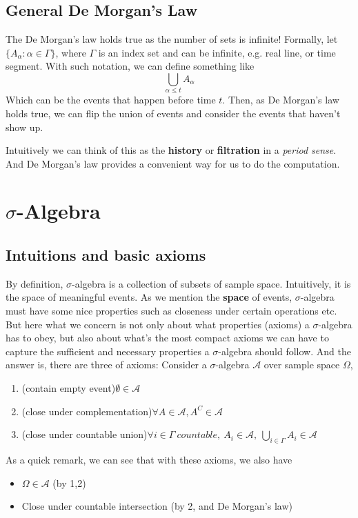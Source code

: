 \documentclass[11pt]{report}
\begin{document}
\subsection{General De Morgan's Law}
The De Morgan's law holds true as the number of sets is infinite! Formally, let $\{A_{\alpha}:\alpha\in\Gamma \}$, where $\Gamma$ is an index set and can be infinite, e.g. real line, or time segment. With such notation, we can define something like
$$\bigcup_{\alpha\leq t} A_{\alpha}$$
Which can be the events that happen before time $t$. Then, as De Morgan's law holds true, we can flip the union of events and consider the events that haven't show up. 

Intuitively we can think of this as the {\bf history} or {\bf filtration} in a {\it period sense}. And De Morgan's law provides a convenient way for us to do the computation.

\section{$\sigma$-Algebra}
\subsection{Intuitions and basic axioms}
By definition, $\sigma$-algebra is a collection of subsets of sample space. Intuitively, it is the space of meaningful events. As we mention the {\bf space} of events, $\sigma$-algebra must have some nice properties such as closeness under certain operations etc. But here what we concern is not only about what properties (axioms) a $\sigma$-algebra has to obey, but also about what's the most compact axioms we can have to capture the sufficient and necessary properties a $\sigma$-algebra should follow. And the answer is, there are three of axioms: Consider a $\sigma$-algebra $\mathcal{A}$ over sample space $\Omega$, 
\begin{enumerate}
	\item (contain empty event)$\emptyset\in\mathcal{A}$
	\item (close under complementation)$\forall A\in\mathcal{A}, A^C\in\mathcal{A}$
	\item (close under countable union)$\forall i\in\Gamma\ countable,\ A_i\in\mathcal{A},\ \bigcup_{i\in\Gamma}A_i\in\mathcal{A}$
\end{enumerate}
As a quick remark, we can see that with these axioms, we also have
\begin{itemize}
	\item $\Omega\in\mathcal{A}$ (by 1,2)
	\item Close under countable intersection (by 2, and De Morgan's law)
\end{itemize}
\end{document}
